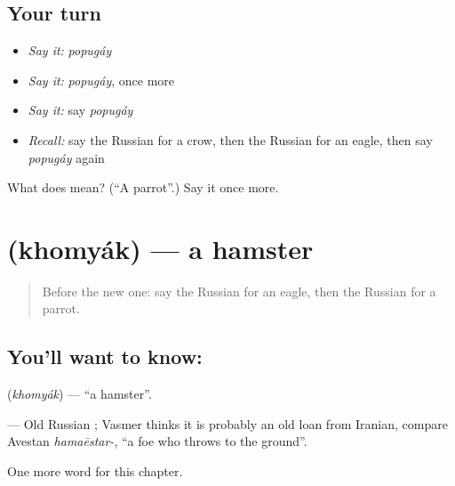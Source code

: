 \subsection*{Your turn}
\begin{itemize}
\raggedright
  \item \emph{Say it:} \emph{popugáy}
  \item \emph{Say it:} \emph{popugáy}, once more
  \item \emph{Say it:} say \emph{popugáy}
  \item \emph{Recall:} say the Russian for a crow, then the Russian for an eagle, then say \emph{popugáy} again
\end{itemize}

\begin{tcolorbox}[breakable,colback=teal!4,colframe=teal!35!black,title={Before you move on}]
What does  mean? (\textquotedblleft{}A parrot\textquotedblright{}.) Say it once more.
\end{tcolorbox}
\section[\texorpdfstring{\ru{хомяк} (khomyák)}{хомяк (khomyák)}]{ (khomyák) — a hamster}

\label{lesson:RU-C165-khomyak}



\begin{quote}
Before the new one: say the Russian for an eagle, then the Russian for a parrot.
\end{quote}

\subsection*{You'll want to know: }
\textbf{} (\emph{khomyák}) — \textquotedblleft{}a hamster\textquotedblright{}.

\begin{cousinweb}
\textbf{} — Old Russian \emph{}; Vasmer thinks it is probably an old loan from Iranian, compare Avestan \emph{hamaēstar-}, \textquotedblleft{}a foe who throws to the ground\textquotedblright{}.
\end{cousinweb}

\begin{grammarlens}[title={What you've built}]
One more word for this chapter.
\end{grammarlens}

